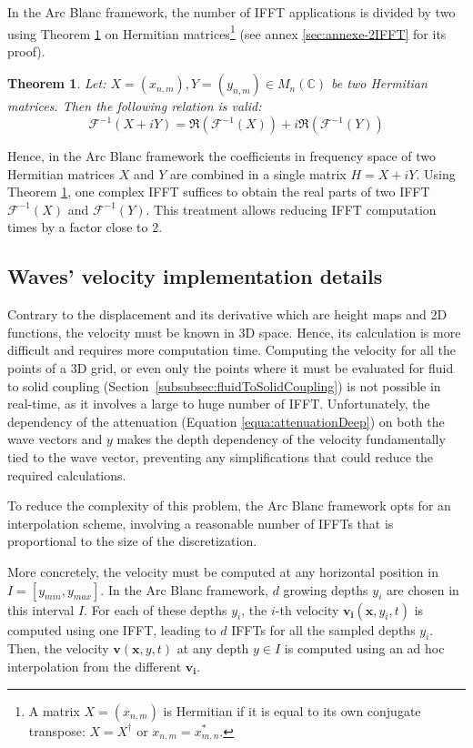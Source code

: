 \documentclass[final]{jcgt}
\newtheorem{theorem}{Theorem}
\def\framework{the Arc Blanc framework\xspace}
\begin{document}
In \framework, the number of IFFT applications is divided by two using Theorem \ref{theorem:ifft} on Hermitian matrices\footnote{A matrix $X=(x_{n,m})$ is Hermitian if it is equal to its own conjugate transpose: $X = X^{\dagger}$ or $x_{n,m}=x^*_{m,n}$.} (see annex \ref{sec:annexe-2IFFT} for its proof).
\begin{theorem}
	\label{theorem:ifft}
	Let: $X=(x_{n,m}), Y=(y_{n,m}) \in M_n(\mathbb{C})$ be two Hermitian matrices.
	Then the following relation is valid:
	\begin{equation}
		\mathcal{F}^{-1}\left(X+iY\right) =
		\Re\left(\mathcal{F}^{-1}\left(X\right)\right)
		+ i\Re\left(\mathcal{F}^{-1}\left(Y\right)\right)
	\end{equation}
\end{theorem}
Hence, in \framework the coefficients in frequency space of two Hermitian matrices $X$ and $Y$ are combined in a single matrix $H=X+iY$.
Using Theorem \ref{theorem:ifft}, one complex IFFT suffices to obtain the real parts of two IFFT $\mathcal{F}^{-1}\left(X\right)$ and $\mathcal{F}^{-1}\left(Y\right)$.
This treatment allows reducing IFFT computation times by a factor close to 2.

\subsection{Waves' velocity implementation details}
Contrary to the displacement and its derivative which are height maps and 2D functions, the velocity must be known in 3D space.
Hence, its calculation is more difficult and requires more computation time.
Computing the velocity for all the points of a 3D grid, or even only the points where it must be evaluated for fluid to solid coupling (Section~\ref{subsubsec:fluidToSolidCoupling}) is not possible in real-time, as it involves a large to huge number of IFFT.
Unfortunately, the dependency of the attenuation (Equation \ref{equa:attenuationDeep}) on both the wave vectors and $y$ makes the depth dependency of the velocity fundamentally tied to the wave vector, preventing any simplifications that could reduce the required calculations.

To reduce the complexity of this problem, \framework opts for an interpolation scheme, involving a reasonable number of IFFTs that is proportional to the size of the discretization.

More concretely, the velocity must be computed at any horizontal position in $I=[y_{min}, y_{max}]$.
In \framework, $d$ growing depths $y_i$ are chosen in this interval $I$.
For each of these depths $y_i$, the $i$-th velocity $\mathbf{v_i}(\mathbf x,y_i,t)$ is computed using one IFFT, leading to $d$ IFFTs for all the sampled depths $y_i$.
Then, the velocity $\mathbf{v}(\mathbf x,y,t)$ at any depth $y\in I$ is computed using an ad hoc interpolation from the different $\mathbf{v_i}$.
\end{document}
